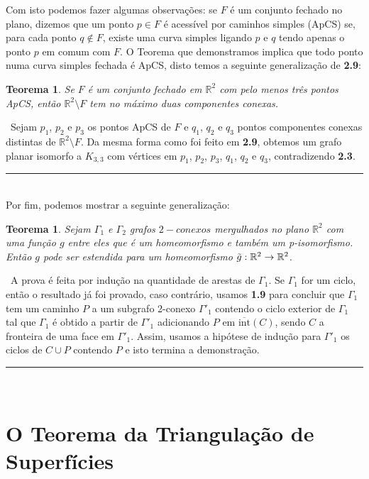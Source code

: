 \documentclass[12pt,a4paper]{article}
\newtheorem{thrm}[mydef]{Teorema}
\def\dem{\par\smallbreak\noindent {\textit{ Demonstração:}} \ }
\def\eop{\hfill\rule{2.5mm}{2.5mm} \\ }
\theoremstyle{definition}
\begin{document}
Com isto podemos fazer algumas observações: se $F$ é um conjunto fechado no plano, dizemos que um ponto $p\in F$ é acessível por caminhos simples (ApCS) se, para cada ponto $q\notin F$, existe uma curva simples ligando $p$ e $q$ tendo apenas o ponto $p$ em comum com $F$. O Teorema que demonstramos implica que todo ponto numa curva simples fechada é ApCS, disto temos a seguinte generalização de \textbf{2.9}:
 
\begin{thrm}
  
    Se $F$ é um conjunto fechado em $\mathbb{R}^2$ com pelo menos três pontos ApCS, então $\mathbb{R}^2\setminus F$ tem no máximo duas componentes conexas.
  
\end{thrm}
 
\dem Sejam $p_1$, $p_2$ e $p_3$ os pontos ApCS de $F$ e  $q_1$, $q_2$ e $q_3$ pontos componentes conexas distintas de $\mathbb{R}^2\setminus F$. Da mesma forma como foi feito em \textbf{2.9}, obtemos um grafo planar isomorfo a $K_{3,3}$ com vértices em $p_1$, $p_2$, $p_3$, $q_1$, $q_2$ e $q_3$, contradizendo \textbf{2.3}. \eop 
 
Por fim, podemos mostrar a seguinte generalização: 

\begin{thrm}
  
    Sejam $\Gamma_1$ e $\Gamma_2$ grafos $2-conexos$ mergulhados no plano $\mathbb{R}^2$ com uma função $g$ entre eles que é um homeomorfismo e também um p-isomorfismo. Então $g$ pode ser estendida para um homeomorfismo  $\Tilde{g}:\mathbb{R}^2\rightarrow \mathbb{R}^2$.
  
\end{thrm}

\dem A prova é feita por indução na quantidade de arestas de $\Gamma_1$. Se $\Gamma_1$ for um ciclo, então o resultado já foi provado, caso contrário, usamos \textbf{1.9} para concluir que $\Gamma_1$ tem um caminho $P$ a um subgrafo 2-conexo $\Gamma'_1$ contendo o ciclo exterior de $\Gamma_1$ tal que $\Gamma_1$ é obtido a partir de $\Gamma'_1$ adicionando $P$ em $\overline{\text{int}}(C)$, sendo $C$ a fronteira de uma face em $\Gamma'_1$. Assim, usamos a hipótese de indução para $\Gamma'_1$ os ciclos de $C\cup P$ contendo $P$ e isto termina a demonstração. \eop 
 
\section{O Teorema da Triangulação de Superfícies}
\end{document}
